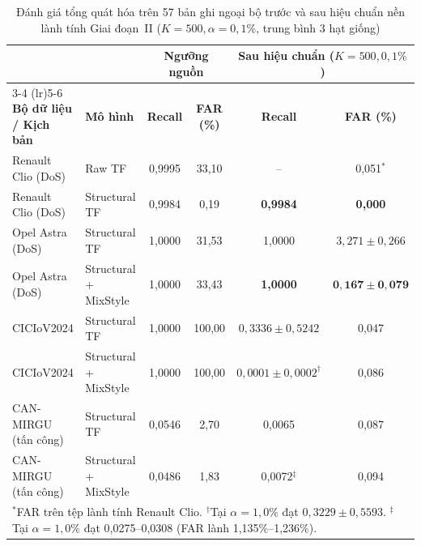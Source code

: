 \documentclass[12pt, a4paper, reqno, oneside]{book}
\begin{document}
\begin{table}[htbp]
  \centering
  \caption[Đánh giá tổng quát hóa trên 57 bản ghi ngoại bộ trước và sau hiệu chuẩn]{Đánh giá tổng quát hóa trên 57 bản ghi ngoại bộ trước và sau hiệu chuẩn nền lành tính Giai đoạn~II ($K=500, \alpha=0{,}1\%$, trung bình 3 hạt giống)}
  \label{tab:external-unified}
  \footnotesize
  \begin{tabular}{@{}l l c c c c@{}}
    \toprule
    & & \multicolumn{2}{c}{\textbf{Ngưỡng nguồn}} & \multicolumn{2}{c}{\textbf{Sau hiệu chuẩn ($K=500, 0{,}1\%$)}} \\
    \cmidrule(lr){3-4} \cmidrule(lr){5-6}
    \textbf{Bộ dữ liệu / Kịch bản} & \textbf{Mô hình} & \textbf{Recall} & \textbf{FAR (\%)} & \textbf{Recall} & \textbf{FAR (\%)} \\
    \midrule
    Renault Clio (DoS) & Raw TF & 0,9995 & 33,10 & -- & 0,051$^*$ \\
    Renault Clio (DoS) & Structural TF & 0,9984 & 0,19 & \textbf{0,9984} & \textbf{0,000} \\
    Opel Astra (DoS) & Structural TF & 1,0000 & 31,53 & 1,0000 & $3,271 \pm 0{,}266$ \\
    Opel Astra (DoS) & Structural + MixStyle & 1,0000 & 33,43 & \textbf{1,0000} & $\mathbf{0{,}167 \pm 0{,}079}$ \\
    CICIoV2024 & Structural TF & 1,0000 & 100,00 & $0,3336 \pm 0{,}5242$ & 0,047 \\
    CICIoV2024 & Structural + MixStyle & 1,0000 & 100,00 & $0{,}0001 \pm 0{,}0002^\dagger$ & 0,086 \\
    CAN-MIRGU (tấn công) & Structural TF & 0,0546 & 2,70 & 0,0065 & 0,087 \\
    CAN-MIRGU (tấn công) & Structural + MixStyle & 0,0486 & 1,83 & 0,0072$^\ddagger$ & 0,094 \\
    \bottomrule
    \multicolumn{6}{l}{\scriptsize $^*$FAR trên tệp lành tính Renault Clio. $^\dagger$Tại $\alpha=1{,}0\%$ đạt $0{,}3229 \pm 0{,}5593$. $^\ddagger$Tại $\alpha=1{,}0\%$ đạt 0,0275--0,0308 (FAR lành 1,135\%--1,236\%).}
  \end{tabular}
\end{table}
\end{document}
